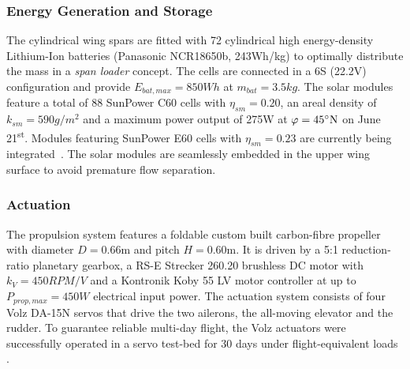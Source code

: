 \subsubsection{Energy Generation and Storage}
The cylindrical wing spars are fitted with 72 cylindrical high energy-density Lithium-Ion batteries (Panasonic NCR18650b, 243Wh/kg) to optimally distribute the mass in a \textit{span loader} concept. The cells are connected in a 6S (22.2V) configuration and provide $E_{bat,max}=850Wh$ at $m_{bat}=3.5kg$. The solar modules feature a total of 88 SunPower C60 cells with $\eta_{sm}=0.20$, an areal density of $k_{sm}=590g/m^2$ and a maximum power output of 275W at $\varphi=45\degree \textrm{N}$ on June 21\textsuperscript{st}. Modules featuring SunPower E60 cells with $\eta_{sm}=0.23$ are currently being integrated~\cite{Sunier_EPFLSolarModules}. The solar modules are seamlessly embedded in the upper wing surface to avoid premature flow separation.

\subsubsection{Actuation}
The propulsion system features a foldable custom built carbon-fibre propeller with diameter $D=0.66\textrm{m}$ and pitch $H=0.60\textrm{m}$. It is driven by a 5:1 reduction-ratio planetary gearbox, a RS-E Strecker 260.20 brushless DC motor with $k_V=450RPM/V$ and a Kontronik Koby 55 LV motor controller at up to $P_{prop,max}=450W$ electrical input power. The actuation system consists of four Volz DA-15N servos that drive the two ailerons, the all-moving elevator and the rudder. To guarantee reliable multi-day flight, the Volz actuators were successfully operated in a servo test-bed for 30 days under flight-equivalent loads \cite{DellaCa_BT}.

